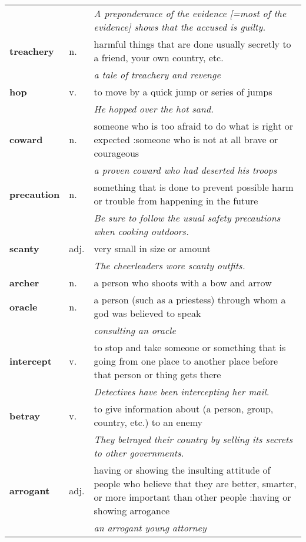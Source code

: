 \documentclass[a4paper]{article}
\begin{document}
\begin{longtable}{llp{11cm}}
 & & \textit{A preponderance of the evidence [=most of the evidence] shows that the accused is guilty.}\\[0.08cm]
\textbf{treachery} & n. &  harmful things that are done usually secretly to a friend, your own country, etc. \\
 & & \textit{a tale of treachery and revenge}\\[0.08cm]
\textbf{hop} & v. &  to move by a quick jump or series of jumps \\
 & & \textit{He hopped over the hot sand.}\\[0.08cm]
\textbf{coward} & n. &  someone who is too afraid to do what is right or expected :someone who is not at all brave or courageous \\
 & & \textit{a proven coward who had deserted his troops}\\[0.08cm]
\textbf{precaution} & n. &  something that is done to prevent possible harm or trouble from happening in the future \\
 & & \textit{Be sure to follow the usual safety precautions when cooking outdoors.}\\[0.08cm]
\textbf{scanty} & adj. &  very small in size or amount \\
 & & \textit{The cheerleaders wore scanty outfits.}\\[0.08cm]
\textbf{archer} & n. &  a person who shoots with a bow and arrow\\[0.08cm]
\textbf{oracle} & n. &  a person (such as a priestess) through whom a god was believed to speak \\
 & & \textit{consulting an oracle}\\[0.08cm]
\textbf{intercept} & v. &  to stop and take someone or something that is going from one place to another place before that person or thing gets there \\
 & & \textit{Detectives have been intercepting her mail.}\\[0.08cm]
\textbf{betray} & v. &  to give information about (a person, group, country, etc.) to an enemy \\
 & & \textit{They betrayed their country by selling its secrets to other governments.}\\[0.08cm]
\textbf{arrogant} & adj. &  having or showing the insulting attitude of people who believe that they are better, smarter, or more important than other people :having or showing arrogance \\
 & & \textit{an arrogant young attorney}\\[0.08cm]

\end{longtable}
\end{document}
